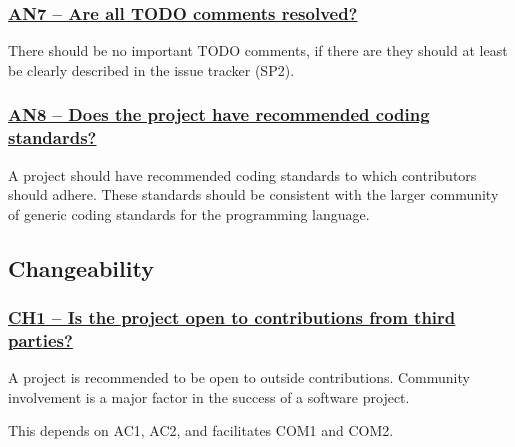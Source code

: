 \documentclass[a4paper,11pt]{article}
\newcommand{\indicator}[1]{\subsubsection*{\underline{#1}}}
\begin{document}
\indicator{AN7 -- Are all TODO comments resolved?}

There should be no important TODO comments, if there are they should at least be
clearly described in the issue tracker (SP2).

\indicator{AN8 -- Does the project have recommended coding standards?}

A project should have recommended coding standards to which contributors
should adhere. These standards should be consistent with the larger community
of generic coding standards for the programming language.

\subsection{Changeability}
%
%
%

\indicator{CH1 -- Is the project open to contributions from third parties?}

A project is recommended to be open to outside contributions. Community
involvement is a major factor in the success of a software project. 

This depends on AC1, AC2, and facilitates COM1 and COM2. 
\end{document}
